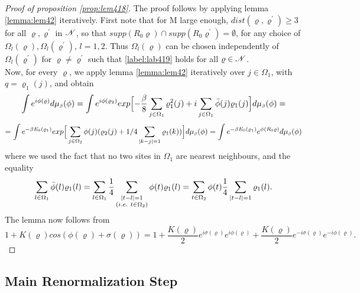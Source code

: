 \documentclass[11pt,reqno]{article}
\DeclarePairedDelimiter\abs{\lvert}{\rvert}%
\theoremstyle{definition}
\begin{document}
\begin{proof}[Proof of proposition \eqref{prop:lem418}]
The proof follows by applying lemma \eqref{lemma:lem42} iteratively.
First note that for M large enough, $dist(\varrho, \varrho^\prime) \geq 3$ for all $\varrho, \varrho^\prime$ in $\mathscr{N}$, so that $supp(R_0\varrho) \cap supp(R_0\varrho^\prime) = \emptyset$, for any choice of $\Omega_l(\varrho), \Omega_l(\varrho^\prime)$, $l=1,2$. Thus $\Omega_l(\varrho)$ can be chosen independently of $\Omega_l(\varrho^\prime)$ for $\varrho \neq \varrho^\prime$ such that \eqref{label:lab419} holds for all $\varrho \in \mathscr{N}$.\\
Now, for every $\varrho$, we apply lemma \eqref{lemma:lem42} iteratively over $j \in \Omega_1$, with $q=\varrho_1(j)$, and obtain
$$
\int e^{i\phi(\varrho)}d\mu_{\text{\tiny$\beta$}}(\phi) = 
\int e^{i\phi(\varrho_2)}exp \Big[ {-\frac{\beta}{8}\sum_{j \in \Omega_1}\varrho_1^2(j)} + i\sum_{j \in \Omega_1} \bar{\phi}(j)\varrho_1(j)\Big] d\mu_{\text{\tiny$\beta$}}(\phi) = 
$$
$$
=\int e^{-\beta E_0(\varrho_1)} exp \Big[ \sum_{j \in \Omega_2}\phi(j) (\varrho_2(j) + 1/4\sum_{\abs{k-j}=1} \varrho_1(k) )\Big] \mida =
\int e^{-\beta E_0(\varrho_1)}e^{\phi(R_0\varrho)}\mida
$$
where we used the fact that no two sites in $\Omega_1$ are nearest neighbours, and the equality
$$
\sum_{l\in\Omega_1}\bar{\phi}(l)\varrho_1(l) = 
\sum_{l\in\Omega_1} \frac{1}{4} \sum_{\substack{\abs{t-l}=1 \\ (i.e.\ t\in \Omega_2)}} \phi(t)\varrho_1(l) = 
\sum_{t \in \Omega_2} \phi(t) \frac{1}{4} \sum_{\abs{t-l}=1} \varrho_1(l).
$$
The lemma now follows from 
$$
1+K(\varrho)cos(\phi(\varrho) + \sigma(\varrho)) = 
1 + 
\frac{K(\varrho)}{2}e^{i\sigma(\varrho)}e^{i\phi(\varrho)} + 
\frac{K(\varrho)}{2}e^{-i\sigma(\varrho)}e^{-i\phi(\varrho)}.
$$
\end{proof}

\subsection{Main Renormalization Step}
\end{document}
